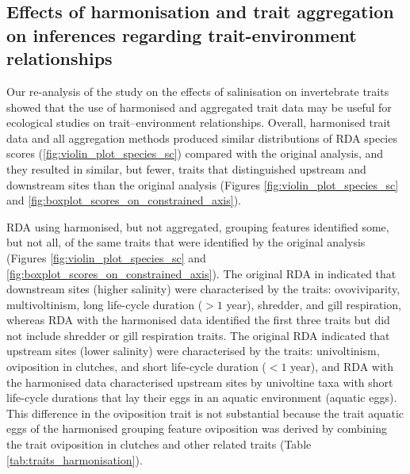 \documentclass[12pt]{article}
\begin{document}
\newpage


\subsection*{Effects of harmonisation and trait aggregation on inferences regarding trait-environment relationships}

Our re-analysis of the \citet{szocs_effects_2014} study on the effects of salinisation on invertebrate traits showed that the use of harmonised and aggregated trait data may be useful for ecological studies on trait–environment relationships. Overall, harmonised trait data and all aggregation methods produced similar distributions of RDA species scores (\ref{fig:violin_plot_species_sc}) compared with the original analysis, and they resulted in similar, but fewer, traits that distinguished upstream and downstream sites than the original analysis (Figures \ref{fig:violin_plot_species_sc} and \ref{fig:boxplot_scores_on_constrained_axis}).

RDA using harmonised, but not aggregated, grouping features identified some, but not all, of the same traits that were identified by the original analysis (Figures \ref{fig:violin_plot_species_sc} and \ref{fig:boxplot_scores_on_constrained_axis}). The original RDA in \citet{szocs_effects_2014} indicated that downstream sites (higher salinity) were characterised by the traits: ovoviviparity, multivoltinism, long life-cycle duration ($> 1$ year), shredder, and gill respiration, whereas RDA with the harmonised data identified the first three traits but did not include shredder or gill respiration traits. The original RDA indicated that upstream sites (lower salinity) were characterised by the traits: univoltinism, oviposition in clutches, and short life-cycle duration ($< 1$ year), and RDA with the harmonised data characterised upstream sites by univoltine taxa with short life-cycle durations that lay their eggs in an aquatic environment (aquatic eggs). This difference in the oviposition trait is not substantial because the trait aquatic eggs of the harmonised grouping feature oviposition was derived by combining the trait oviposition in clutches and other related traits (Table \ref{tab:traits_harmonisation}).
\end{document}
